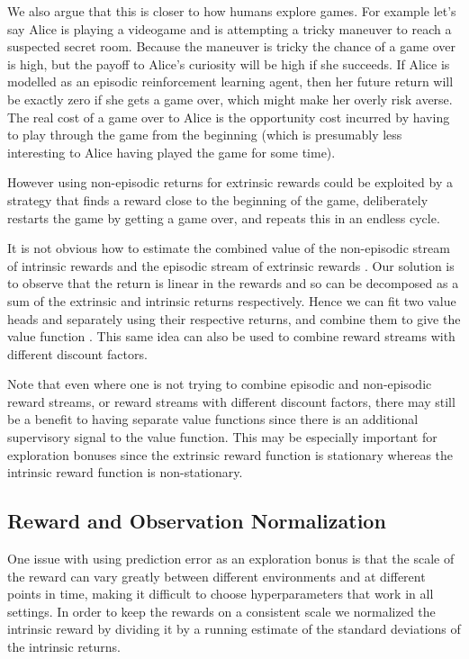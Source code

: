\documentclass{article} \usepackage[dvipsnames]{xcolor}
\begin{document}
We also argue that this is closer to how humans explore games. For example let's say Alice is playing a videogame and is attempting a tricky maneuver to reach a suspected secret room. Because the maneuver is tricky the chance of a game over is high, but the payoff to Alice's curiosity will be high if she succeeds. If Alice is modelled as an episodic reinforcement learning agent, then her future return will be exactly zero if she gets a game over, which might make her overly risk averse. The real cost of a game over to Alice is the opportunity cost incurred by having to play through the game from the beginning (which is presumably less interesting to Alice having played the game for some time).

However using non-episodic returns for extrinsic rewards could be exploited by a strategy that finds a reward close to the beginning of the game, deliberately restarts the game by getting a game over, and repeats this in an endless cycle.

It is not obvious how to estimate the combined value of the non-episodic stream of intrinsic rewards  and the episodic stream of extrinsic rewards . Our solution is to observe that the return is linear in the rewards and so can be decomposed as a sum  of the extrinsic and intrinsic returns respectively. Hence we can fit two value heads  and  separately using their respective returns, and combine them to give the value function . This same idea can also be used to combine reward streams with different discount factors.

Note that even where one is not trying to combine episodic and non-episodic reward streams, or reward streams with different discount factors, there may still be a benefit to having separate value functions since there is an additional supervisory signal to the value function. This may be especially important for exploration bonuses since the extrinsic reward function is stationary whereas the intrinsic reward function is non-stationary.

\subsection{Reward and Observation Normalization}
One issue with using prediction error as an exploration bonus is that the scale of the reward can vary greatly between different environments and at different points in time, making it difficult to choose hyperparameters that work in all settings. In order to keep the rewards on a consistent scale we normalized the intrinsic reward by dividing it by a running estimate of the standard deviations of the intrinsic returns.
\end{document}
